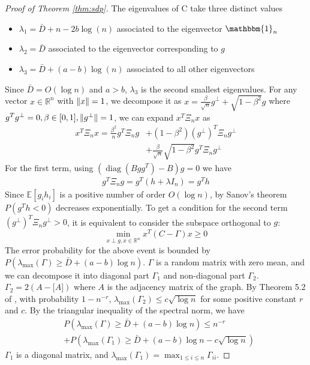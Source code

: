 \documentclass[conference]{IEEEtran}
\DeclarePairedDelimiter\norm{\lVert}{\rVert}
\DeclareMathOperator{\diag}{diag}
\begin{document}
\begin{proof}[Proof of Theorem \ref{thm:sdp}]
		The eigenvalues of C take three distinct values
		\begin{itemize}
			\item $\lambda_1=\bar{D}+n-2b \log(n)$ associated to the eigenvector $\mathbbm{1}_n$
			\item $\lambda_2=\bar{D}$ associated to the eigenvector corresponding to  $g$
			\item $\lambda_3=\bar{D}+(a-b)\log(n)$ associated to all other eigenvectors
		\end{itemize}
		Since $\bar{D}=O(\log n)$ and $a>b$, $\lambda_3$ is the second smallest eigenvalues.
		For any vector $x \in \mathbb{R}^n$ with $\norm{x}=1$, we decompose it as $x=\frac{\beta}{\sqrt{n}} g^{\perp}
		+ \sqrt{1-\beta^2} g$ where $g^Tg^{\perp}=0, \beta \in [0,1], \norm{g^{\perp}}=1$, we can expand $x^T \Xi_n x$ as
		\begin{align*}
		x^T \Xi_n x = \frac{\beta^2}{n} g^T \Xi_n g  &+ (1-\beta^2)(g^{\perp})^T \Xi_n g^{\perp} \\
		&+
		\frac{\beta}{\sqrt{n}}\sqrt{1-\beta^2} g^T \Xi_n g^{\perp}
		\end{align*}
		For the first term, using $(\diag(Bgg^T) - B)g=0$ we have
		\begin{align*}
		g^T \Xi_n g = g^T(h+\lambda I_n) = g^T h
		\end{align*}
		Since $\mathbb{E}[g_ih_i]$ is a positive number of order $O(\log n)$, by Sanov's theorem
		$P(g^T h < 0)$ decreases exponentially. To get a condition for the second term $(g^{\perp})^T \Xi_n g^{\perp} >0$, it is equivalent
		to consider the subspace orthogonal to $g$:
		$$
		\min_{x \perp g, x \in \mathbb{R}^n } x^T (C-\Gamma) x \geq 0
		$$
		The error probability for the above event is bounded by
		$P(\lambda_{\max}(\Gamma) \geq \bar{D}+(a-b)\log n)$.
		$\Gamma$ is a random matrix with zero mean, and we can decompose it into diagonal part
		$\Gamma_1$ and non-diagonal part $\Gamma_2$. $\Gamma_2=2(A-\mathbb[A])$
		where $A$ is the adjacency matrix of the graph. By Theorem 5.2 of \cite{lei2015consistency},
		with probability $1-n^{-r}$, $\lambda_{\max}(\Gamma_2) \leq c\sqrt{\log n}$ for some positive constant $r$ and $c$. By the triangular inequality of the spectral norm, we have
		\begin{align*}
		&P(\lambda_{\max}(\Gamma) \geq  \bar{D}+(a-b)\log n)
		\leq n^{-r}  \\
		& + P(\lambda_{\max}(\Gamma_1) \geq \bar{D}+(a-b)\log n - c\sqrt{\log n})
		\end{align*}
		$\Gamma_1$ is a diagonal matrix, and $\lambda_{\max}(\Gamma_1) = \max_{1\leq i \leq n} \Gamma_{ii}$.

\end{proof}
\end{document}
